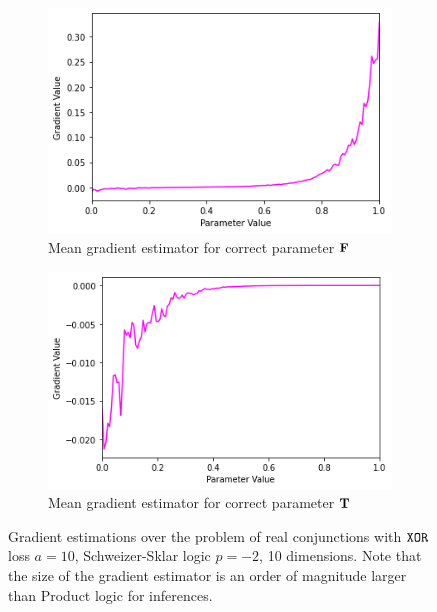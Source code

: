\begin{figure}[ht]
\begin{subfigure}[b]{0.47\textwidth}
        \includegraphics[width=\textwidth]{imgs/grad_ss_10_falseparam_avg.png}
        \caption{Mean gradient estimator for correct parameter $\textbf{F}$}
        \label{fig:conjgrad10falseavgss}
    \end{subfigure}
    \begin{subfigure}[b]{0.47\textwidth}
        \centering
        \includegraphics[width=\textwidth]{imgs/grad_ss_10_trueparam_avg.png}
        \caption{Mean gradient estimator for correct parameter $\textbf{T}$}
        \label{fig:conjgrad10trueavgss}
    \end{subfigure}
       \caption{Gradient estimations over the problem of real conjunctions with $\texttt{XOR}$ loss $a=10$, Schweizer-Sklar logic $p=-2$, 10 dimensions. Note that the size of the gradient estimator is an order of magnitude larger than Product logic for inferences.}
       \label{fig:conjgrad10ss}
\end{figure}

